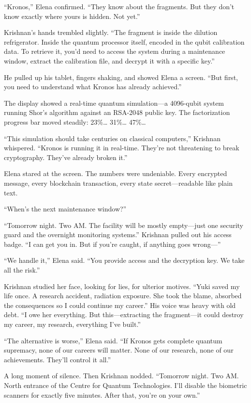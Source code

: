 ``Kronos,'' Elena confirmed. ``They know about the fragments. But they don't know exactly where yours is hidden. Not yet.''

Krishnan's hands trembled slightly. ``The fragment is inside the dilution refrigerator. Inside the quantum processor itself, encoded in the qubit calibration data. To retrieve it, you'd need to access the system during a maintenance window, extract the calibration file, and decrypt it with a specific key.''

He pulled up his tablet, fingers shaking, and showed Elena a screen. ``But first, you need to understand what Kronos has already achieved.''

The display showed a real-time quantum simulation---a 4096-qubit system running Shor's algorithm against an RSA-2048 public key. The factorization progress bar moved steadily: 23\%\ldots{} 31\%\ldots{} 47\%\ldots{}

``This simulation should take centuries on classical computers,'' Krishnan whispered. ``Kronos is running it in real-time. They're not threatening to break cryptography. They've already broken it.''

Elena stared at the screen. The numbers were undeniable. Every encrypted message, every blockchain transaction, every state secret---readable like plain text.

``When's the next maintenance window?''

``Tomorrow night. Two AM. The facility will be mostly empty---just one security guard and the overnight monitoring systems.'' Krishnan pulled out his access badge. ``I can get you in. But if you're caught, if anything goes wrong---''

``We handle it,'' Elena said. ``You provide access and the decryption key. We take all the risk.''

Krishnan studied her face, looking for lies, for ulterior motives. ``Yuki saved my life once. A research accident, radiation exposure. She took the blame, absorbed the consequences so I could continue my career.'' His voice was heavy with old debt. ``I owe her everything. But this---extracting the fragment---it could destroy my career, my research, everything I've built.''

``The alternative is worse,'' Elena said. ``If Kronos gets complete quantum supremacy, none of our careers will matter. None of our research, none of our achievements. They'll control it all.''

A long moment of silence. Then Krishnan nodded. ``Tomorrow night. Two AM. North entrance of the Centre for Quantum Technologies. I'll disable the biometric scanners for exactly five minutes. After that, you're on your own.''

